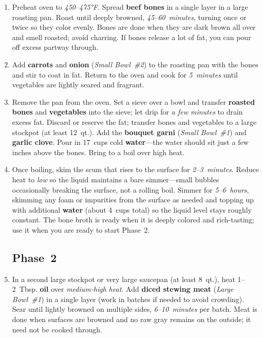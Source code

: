 \documentclass[11pt,letterpaper]{article}
\begin{document}
\begin{enumerate}
    \item Preheat oven to \textit{450--475°F}. Spread \textbf{beef bones} in a single layer in a large roasting pan. Roast until deeply browned, \textit{45--60~minutes}, turning once or twice so they color evenly. Bones are done when they are dark brown all over and smell roasted; avoid charring. If bones release a lot of fat, you can pour off excess partway through.

    \item Add \textbf{carrots} and \textbf{onion} (\textit{Small Bowl~\#2}) to the roasting pan with the bones and stir to coat in fat. Return to the oven and cook for \textit{5~minutes} until vegetables are lightly seared and fragrant.

    \item Remove the pan from the oven. Set a sieve over a bowl and transfer \textbf{roasted bones} and \textbf{vegetables} into the sieve; let drip for \textit{a few minutes} to drain excess fat. Discard or reserve the fat; transfer bones and vegetables to a large stockpot (at least 12~qt.). Add the \textbf{bouquet garni} (\textit{Small Bowl~\#1}) and \textbf{garlic clove}. Pour in 17~cups cold \textbf{water}---the water should sit just a few inches above the bones. Bring to a boil over high heat.

    \item Once boiling, skim the scum that rises to the surface for \textit{2--3~minutes}. Reduce heat to \textit{low} so the liquid maintains a bare simmer---small bubbles occasionally breaking the surface, not a rolling boil. Simmer for \textit{5--6~hours}, skimming any foam or impurities from the surface as needed and topping up with additional \textbf{water} (about 4~cups total) so the liquid level stays roughly constant. The bone broth is ready when it is deeply colored and rich-tasting; use it when you are ready to start Phase~2.


    \subsection*{Phase~2}

    \item In a second large stockpot or very large saucepan (at least 8~qt.), heat 1--2~Tbsp. \textbf{oil} over \textit{medium-high heat}. Add \textbf{diced stewing meat} (\textit{Large Bowl~\#1}) in a single layer (work in batches if needed to avoid crowding). Sear until lightly browned on multiple sides, \textit{6--10~minutes} per batch. Meat is done when surfaces are browned and no raw gray remains on the outside; it need not be cooked through.


\end{enumerate}
\end{document}
